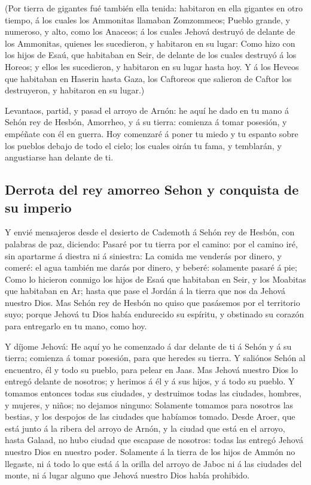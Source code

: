  (Por tierra de gigantes fué también ella tenida:
habitaron en ella gigantes en otro tiempo, á los cuales los Ammonitas
llamaban Zomzommeos;  Pueblo grande, y numeroso, y alto,
como los Anaceos; á los cuales Jehová destruyó de delante de los
Ammonitas, quienes les sucedieron, y habitaron en su lugar:
 Como hizo con los hijos de Esaú, que habitaban en Seir,
de delante de los cuales destruyó á los Horeos; y ellos les sucedieron,
y habitaron en su lugar hasta hoy.  Y á los Heveos que
habitaban en Haserin hasta Gaza, los Caftoreos que salieron de Caftor
los destruyeron, y habitaron en su lugar.)

 Levantaos, partid, y pasad el arroyo de Arnón: he aquí
he dado en tu mano á Sehón rey de Hesbón, Amorrheo, y á su tierra:
comienza á tomar posesión, y empéñate con él en guerra. 
Hoy comenzaré á poner tu miedo y tu espanto sobre los pueblos debajo de
todo el cielo; los cuales oirán tu fama, y temblarán, y angustiarse han
delante de ti.

\hypertarget{derrota-del-rey-amorreo-sehon-y-conquista-de-su-imperio}{%
\subsection{Derrota del rey amorreo Sehon y conquista de su
imperio}\label{derrota-del-rey-amorreo-sehon-y-conquista-de-su-imperio}}

 Y envié mensajeros desde el desierto de Cademoth á Sehón
rey de Hesbón, con palabras de paz, diciendo:  Pasaré por
tu tierra por el camino: por el camino iré, sin apartarme á diestra ni á
siniestra:  La comida me venderás por dinero, y comeré:
el agua también me darás por dinero, y beberé: solamente pasaré á pie;
 Como lo hicieron conmigo los hijos de Esaú que habitaban
en Seir, y los Moabitas que habitaban en Ar; hasta que pase el Jordán á
la tierra que nos da Jehová nuestro Dios.  Mas Sehón rey
de Hesbón no quiso que pasásemos por el territorio suyo; porque Jehová
tu Dios había endurecido su espíritu, y obstinado su corazón para
entregarlo en tu mano, como hoy.

 Y díjome Jehová: He aquí yo he comenzado á dar delante
de ti á Sehón y á su tierra; comienza á tomar posesión, para que heredes
su tierra.  Y saliónos Sehón al encuentro, él y todo su
pueblo, para pelear en Jaas.  Mas Jehová nuestro Dios lo
entregó delante de nosotros; y herimos á él y á sus hijos, y á todo su
pueblo.  Y tomamos entonces todas sus ciudades, y
destruimos todas las ciudades, hombres, y mujeres, y niños; no dejamos
ninguno:  Solamente tomamos para nosotros las bestias, y
los despojos de las ciudades que habíamos tomado.  Desde
Aroer, que está junto á la ribera del arroyo de Arnón, y la ciudad que
está en el arroyo, hasta Galaad, no hubo ciudad que escapase de
nosotros: todas las entregó Jehová nuestro Dios en nuestro poder.
 Solamente á la tierra de los hijos de Ammón no llegaste,
ni á todo lo que está á la orilla del arroyo de Jaboc ni á las ciudades
del monte, ni á lugar alguno que Jehová nuestro Dios había prohibido.

